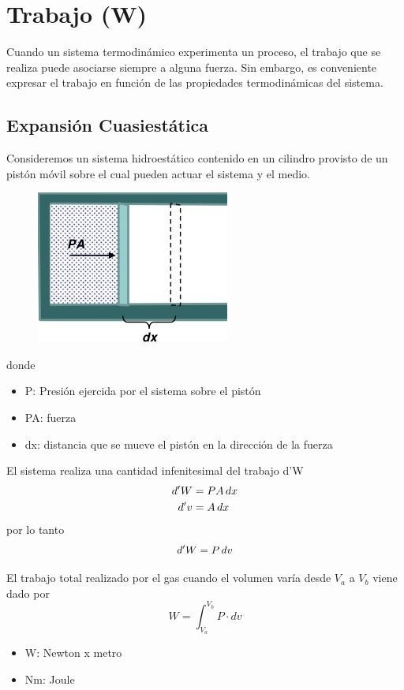 \documentclass[12pt,twocolumn,a4paper]{report}
\begin{document}
\chapter*{Trabajo (W)}
Cuando un sistema termodinámico experimenta un proceso, el trabajo que se realiza puede asociarse siempre a alguna fuerza. Sin embargo, es conveniente expresar el trabajo en función de las propiedades termodinámicas del sistema.

\section*{Expansión Cuasiestática}
Consideremos un sistema hidroestático contenido en un cilindro provisto de un pistón móvil sobre el cual pueden actuar el sistema y el medio.
\begin{figure}[H]
\centering
\includegraphics[scale=0.5]{graficos/trab1.jpeg}
\end{figure}
donde 
\begin{itemize}
\setlength\itemsep{0.001cm}
\item{P: Presión ejercida por el sistema sobre el pistón}
\item{PA: fuerza}
\item{dx: distancia que se mueve el pistón en la dirección de la fuerza}
\end{itemize}
El sistema realiza una cantidad infenitesimal del trabajo d'W 
\begin{align*}
d'W &= PA\thinspace dx \\
d'v &= A\thinspace dx 
\end{align*}
por lo tanto 
\begin{equation*}
d'W = P\thinspace dv 
\end{equation*}

El trabajo total realizado por el gas cuando el volumen varía desde $V_a$ a $V_b$ viene dado por
\begin{equation*}
W = \int_{V_a}^{V_b} P \cdot dv
\end{equation*}
\begin{itemize}
\setlength\itemsep{0.001cm}
\item{W: Newton x metro}
\item{Nm: Joule}
\end{itemize}
\end{document}
